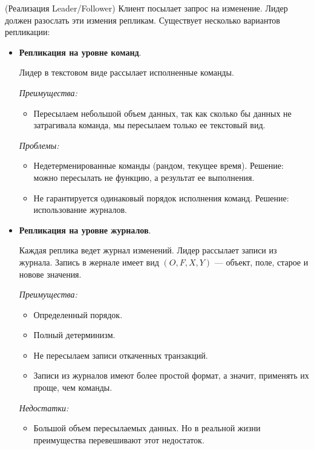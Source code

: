 \begin{algorithm}(Реализация Leader/Follower)
    Клиент посылает запрос на изменение. Лидер должен разослать эти измения репликам. Существует несколько вариантов репликации:
    \begin{itemize}
        \item \textbf{Репликация на уровне команд}.

        Лидер в текстовом виде рассылает исполненные команды.

        \textit{Преимущества:}
        \begin{itemize}
            \item Пересылаем небольшой объем данных, так как сколько бы данных не затрагивала команда, мы пересылаем только ее текстовый вид.
        \end{itemize}

        \textit{Проблемы:}
        \begin{itemize}
            \item Недетерменированные команды (рандом, текущее время). Решение: можно пересылать не функцию, а результат ее выполнения.
            \item Не гарантируется одинаковый порядок исполнения команд. Решение: использование журналов.
        \end{itemize}
        \item \textbf{Репликация на уровне журналов}.

        Каждая реплика ведет журнал изменений. Лидер рассылает записи из журнала. Запись в жернале имеет вид $(O, F, X, Y)$ --- объект, поле, старое и новове значения.

        \textit{Преимущества:}
        \begin{itemize}
            \item Определенный порядок.
            \item Полный детерминизм.
            \item Не пересылаем записи откаченных транзакций.
            \item Записи из журналов имеют более простой формат, а значит, применять их проще, чем команды.
        \end{itemize}

        \textit{Недостатки:}
        \begin{itemize}
            \item Большой объем пересылаемых данных. Но в реальной жизни преимущества перевешивают этот недостаток.
        \end{itemize}

    \end{itemize}

\end{algorithm}

